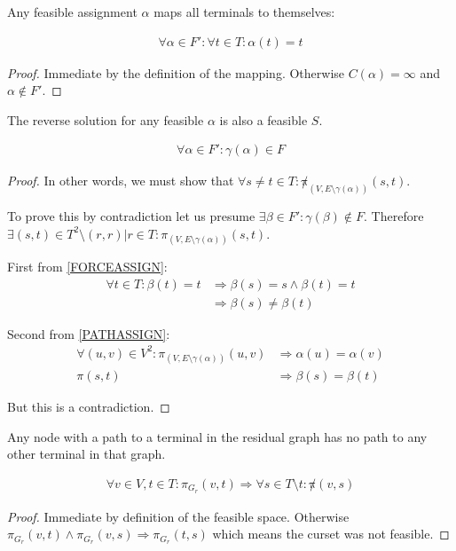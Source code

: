 \documentclass{article}
\begin{document}
\begin{lemma}
\label{FORCEASSIGN}
Any feasible assignment $\alpha$ maps all terminals to themselves:

\begin{align}
	\nonumber \forall \alpha \in F' : \forall t \in T : \alpha(t) = t
\end{align}
\end{lemma}
\begin{proof}
Immediate by the definition of the mapping.
Otherwise $C(\alpha) = \infty$ and $\alpha \not\in F'$.
\end{proof}

\begin{lemma}
\label{REVERSEFEASABLE}
The reverse solution for any feasible $\alpha$ is also a feasible $S$.

\begin{align}
	\nonumber \forall \alpha \in F' : \gamma(\alpha) \in F
\end{align}
\end{lemma}
\begin{proof}
In other words, we must show that $\forall s \neq t \in T : \not\pi_{(V, E \setminus \gamma(\alpha))}(s, t)$.

To prove this by contradiction let us presume $\exists \beta \in F' : \gamma(\beta) \not\in F$.
Therefore $\exists (s, t) \in T^2 \setminus {(r,r) | r \in T} : \pi_{(V, E \setminus \gamma(\alpha))}(s, t)$.

First from \ref{FORCEASSIGN}:
\begin{align}
	\nonumber \forall t \in T : \beta(t) = t & \Rightarrow \beta(s) = s \wedge \beta(t) = t \\
	\nonumber & \Rightarrow \beta(s) \neq \beta(t)
\end{align}

Second from \ref{PATHASSIGN}:
\begin{align}
	\nonumber \forall (u, v) \in V^2 : \pi_{(V, E \setminus \gamma(\alpha))}(u,v) & \Rightarrow \alpha(u) = \alpha(v) \\
	\nonumber \pi(s, t) & \Rightarrow \beta(s) = \beta(t)
\end{align}

But this is a contradiction.
\end{proof}

\begin{lemma}
\label{SINGLEPATH}
Any node with a path to a terminal in the residual graph has no path to any other terminal in that graph.

\begin{align}
	\nonumber \forall v \in V, t \in T : \pi_{G_r}(v,t) \Rightarrow \forall s \in T \setminus {t} : \not\pi(v,s)
\end{align}
\end{lemma}
\begin{proof}
Immediate by definition of the feasible space.
Otherwise $\pi_{G_r}(v,t) \wedge \pi_{G_r}(v,s) \Rightarrow \pi_{G_r}(t,s)$ which means the curset was not feasible.
\end{proof}
\end{document}
